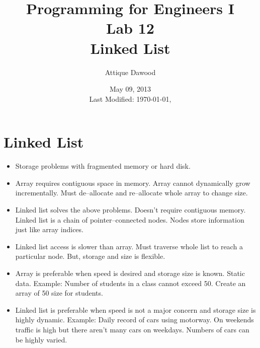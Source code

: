 \documentclass[12pt,a4paper]{article}
\title{\vspace{-1cm}Programming for Engineers I\\Lab 12\\Linked List}
\author{Attique Dawood}
\date{May 09, 2013\\[0.2cm] Last Modified: \today, \currenttime}
\begin{document}
\maketitle
\section{Linked List}
\begin{itemize}
\item Storage problems with fragmented memory or hard disk.
\item Array requires contiguous space in memory. Array cannot dynamically grow incrementally. Must de--allocate and re--allocate whole array to change size.
\item Linked list solves the above problems. Doesn't require contiguous memory. Linked list is a chain of pointer--connected nodes. Nodes store information just like array indices.
\item Linked list access is slower than array. Must traverse whole list to reach a particular node. But, storage and size is flexible.
\item Array is preferable when speed is desired and storage size is known. Static data. Example: Number of students in a class cannot exceed 50. Create an array of 50 size for students.
\item Linked list is preferable when speed is not a major concern and storage size is highly dynamic. Example: Daily record of cars using motorway. On weekends traffic is high but there aren't many cars on weekdays. Numbers of cars can be highly varied.
\end{itemize}
\end{document}
